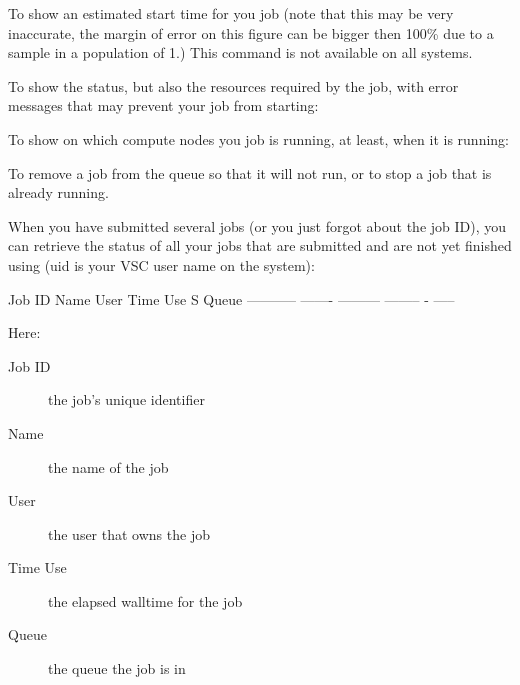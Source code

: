 \begin{prompt}
\end{prompt}

To show an estimated start time for you job (note that this may be very inaccurate,
the margin of error on this figure can be bigger then 100\% due to a sample in a
population of 1.)
This command is not available on all systems.

\begin{prompt}
\end{prompt}

To show the status, but also the resources required by the job, with error
messages that may prevent your job from starting:

\begin{prompt}
\end{prompt}

To show on which compute nodes you job is running, at least, when it is
running:

\begin{prompt}
\end{prompt}

To remove a job from the queue so that it will not run, or to stop a job that
is already running.

\begin{prompt}
\end{prompt}

When you have submitted several jobs (or you just forgot about the job ID), you
can retrieve the status of all your jobs that are submitted and are not yet
finished using (uid is your VSC user name on the system):

\begin{prompt}
Job ID      Name    User      Time Use S Queue
----------- ------- --------- -------- - -----
\end{prompt}

Here:
\begin{description}
  \item[Job ID] the job's unique identifier
  \item[Name] the name of the job
  \item[User] the user that owns the job
  \item[Time Use] the elapsed walltime for the job
  \item[Queue] the queue the job is in
\end{description}

